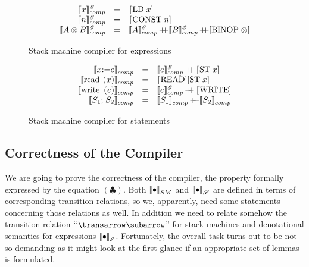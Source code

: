 \begin{figure}
\[
\begin{array}{rcl}
  \sembr{x}^{\mathscr E}_{comp}&=&\llang{[LD $\;x$]}\\
  \sembr{n}^{\mathscr E}_{comp}&=&\llang{[CONST $\;n$]}\\
  \sembr{A\otimes B}^{\mathscr E}_{comp}&=&\sembr{A}^{\mathscr E}_{comp}\dplus\sembr{B}^{\mathscr E}_{comp}\dplus[\llang{BINOP $\;\otimes$}]
\end{array}
\]
\caption{Stack machine compiler for expressions}
\label{expr-comp}
\end{figure}

\begin{figure}
\[
\begin{array}{rcl}
  \sembr{\llang{$x$ := $e$}}^\ph_{comp}&=&\sembr{e}^{\mathscr E}_{comp}\dplus\llang{[ST $\;x$]}\\
  \sembr{\llang{read ($x$)}}^\ph_{comp}&=&\llang{[READ][ST $\;x$]}\\
  \sembr{\llang{write ($e$)}}^\ph_{comp}&=&\sembr{e}^{\mathscr E}_{comp}\dplus\llang{[WRITE]}\\
  \sembr{\llang{$S_1$;$\;S_2$}}^\ph_{comp}&=&\sembr{S_1}^\ph_{comp}\dplus\sembr{S_2}^\ph_{comp}
\end{array}
\]
\caption{Stack machine compiler for statements}
\label{stmt-comp}
\end{figure}

\subsection{Correctness of the Compiler}

We are going to prove the correctness of the compiler, the property formally expressed by the equation $(\clubsuit)$. Both $\sembr{\bullet}^\ph_{SM}$ and $\sembr{\bullet}^\ph_\mathscr{S}$ are
defined in terms of corresponding transition relations, so we, apparently, need some statements concerning those relations as well. In addition we need to relate somehow
the transition relation ``$\transrel$'' for stack machines and denotational semantics for expressions $\sembr{\bullet}^\ph_\mathscr{E}$. Fortunately, the overall task turns out
to be not so demanding as it might look at the first glance if an appropriate set of lemmas is formulated.

